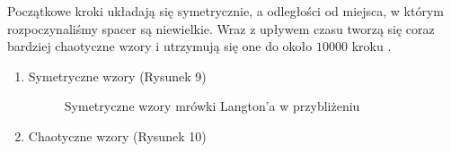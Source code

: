 \documentclass[a4paper,12pt]{article}
\begin{document}
Początkowe kroki układają się symetrycznie, a odległości od miejsca, w którym rozpoczynaliśmy spacer są niewielkie. 
Wraz z upływem czasu tworzą się coraz bardziej chaotyczne wzory i utrzymują się one do około $10 000$ kroku \cite{l}.
\begin{enumerate}
    \item Symetryczne wzory (Rysunek 9)
\begin{figure}[!htb]
\centering
{}
\quad
{}
\quad
{}
\caption{Symetryczne wzory mrówki Langton'a w przybliżeniu}
\label{fig:animals}
\end{figure}    
\item Chaotyczne wzory (Rysunek 10)
\begin{figure}[!htb]
\centering
{}
\quad
{}

\end{figure}
\end{enumerate}
\end{document}
